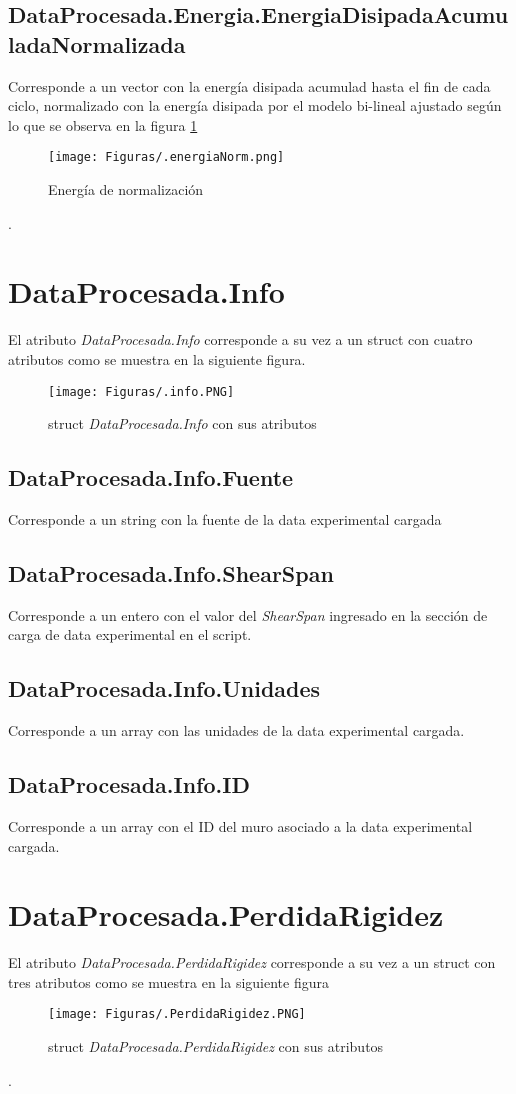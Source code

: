 \documentclass[a4paper, 11pt,article,oneside]{memoir}%
\begin{document}
\section{DataProcesada.Energia.EnergiaDisipadaAcumuladaNormalizada}
Corresponde a un vector con la energía disipada acumulad hasta el fin de cada ciclo, normalizado con la energía disipada por el modelo bi-lineal ajustado según lo que se observa en la figura \ref{fig:first resumen e44 }

\begin{figure}[h!]
    \centering
    \texttt{[image: Figuras/.energiaNorm.png]}
    \caption{Energía de normalización}
    \label{fig:first resumen e44 }
\end{figure}.
\newpage\null \newpage
\chapter{DataProcesada.Info}
El atributo \textit{DataProcesada.Info} corresponde a su vez a un struct con cuatro atributos como se muestra en la siguiente figura.\par
\begin{figure}[h!]
    \centering
    \texttt{[image: Figuras/.info.PNG]}
    \caption{struct \textit{DataProcesada.Info} con sus atributos}
    \label{fig:first resumen e4 }
\end{figure}
\section{DataProcesada.Info.Fuente}
Corresponde a un string con la fuente de la data experimental cargada
\section{DataProcesada.Info.ShearSpan}
Corresponde a un entero con el valor del \textit{ShearSpan} ingresado en la  sección de carga de data experimental en el script.
\section{DataProcesada.Info.Unidades}
Corresponde a un array con las unidades de la data experimental cargada.
\section{DataProcesada.Info.ID}
Corresponde a un array con el ID del muro asociado a la data experimental cargada.
\newpage
\chapter{DataProcesada.PerdidaRigidez}
El atributo \textit{DataProcesada.PerdidaRigidez} corresponde a su vez a un struct con tres atributos como se muestra en la siguiente figura
\begin{figure}[h!]
    \centering
    \texttt{[image: Figuras/.PerdidaRigidez.PNG]}
    \caption{struct \textit{DataProcesada.PerdidaRigidez} con sus atributos}
    \label{fig:first resumen e4 }
\end{figure}.
\end{document}
